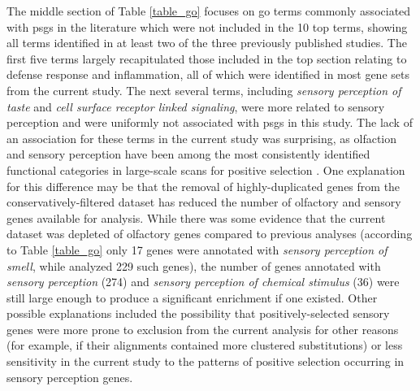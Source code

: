 The middle section of Table \ref{table_go} focuses on \ac{go} terms
commonly associated with \acp{psg} in the literature which were not
included in the 10 top terms, showing all terms identified in at least
two of the three previously published studies. The first five terms
largely recapitulated those included in the top section relating to
defense response and inflammation, all of which were identified in
most gene sets from the current study. The next several terms,
including \emph{sensory perception of taste} and \emph{cell surface
  receptor linked signaling}, were more related to sensory perception
and were uniformly not associated with \acp{psg} in this study. The
lack of an association for these terms in the current study was
surprising, as olfaction and sensory perception have been among the
most consistently identified functional categories in large-scale
scans for positive selection \citep{Nielsen2005,Nielsen2005b}. One
explanation for this difference may be that the removal of
highly-duplicated genes from the conservatively-filtered dataset has
reduced the number of olfactory and sensory genes available for
analysis. While there was some evidence that the current dataset was
depleted of olfactory genes compared to previous analyses (according
to Table \ref{table_go} only 17 genes were annotated with
\emph{sensory perception of smell}, while \citet{Kosiol2008} analyzed
229 such genes), the number of genes annotated with \emph{sensory
  perception} (274) and \emph{sensory perception of chemical stimulus}
(36) were still large enough to produce a significant enrichment if
one existed. Other possible explanations included the possibility that
positively-selected sensory genes were more prone to exclusion from
the current analysis for other reasons (for example, if their
alignments contained more clustered \nsyn substitutions) or less
sensitivity in the current study to the patterns of positive selection
occurring in sensory perception genes.

